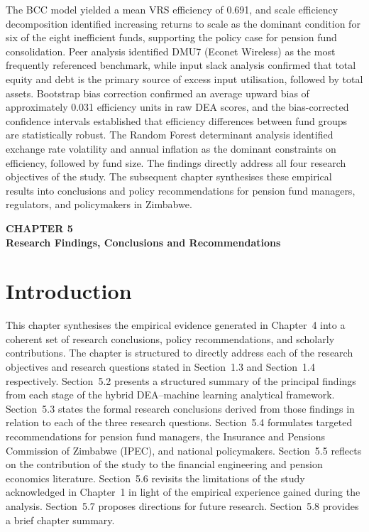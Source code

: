 \documentclass[12pt,a4paper]{article}
\begin{document}
The BCC model yielded a mean VRS efficiency of 0.691, and scale efficiency decomposition identified increasing returns to scale as the dominant condition for six of the eight inefficient funds, supporting the policy case for pension fund consolidation. Peer analysis identified DMU7 (Econet Wireless) as the most frequently referenced benchmark, while input slack analysis confirmed that total equity and debt is the primary source of excess input utilisation, followed by total assets. Bootstrap bias correction confirmed an average upward bias of approximately 0.031 efficiency units in raw DEA scores, and the bias-corrected confidence intervals established that efficiency differences between fund groups are statistically robust. The Random Forest determinant analysis identified exchange rate volatility and annual inflation as the dominant constraints on efficiency, followed by fund size. The findings directly address all four research objectives of the study. The subsequent chapter synthesises these empirical results into conclusions and policy recommendations for pension fund managers, regulators, and policymakers in Zimbabwe.
\newpage
\begin{center}
    {\LARGE\bfseries CHAPTER 5}\\[0.5cm]
    {\Large\bfseries Research Findings, Conclusions and Recommendations}
\end{center}
\setcounter{section}{0}
\renewcommand{\thesection}{5.\arabic{section}}
{}

\vspace{1cm}

\section{Introduction}

This chapter synthesises the empirical evidence generated in Chapter~4 into a coherent set of research conclusions, policy recommendations, and scholarly contributions. The chapter is structured to directly address each of the research objectives and research questions stated in Section~1.3 and Section~1.4 respectively. Section~5.2 presents a structured summary of the principal findings from each stage of the hybrid DEA--machine learning analytical framework. Section~5.3 states the formal research conclusions derived from those findings in relation to each of the three research questions. Section~5.4 formulates targeted recommendations for pension fund managers, the Insurance and Pensions Commission of Zimbabwe (IPEC), and national policymakers. Section~5.5 reflects on the contribution of the study to the financial engineering and pension economics literature. Section~5.6 revisits the limitations of the study acknowledged in Chapter~1 in light of the empirical experience gained during the analysis. Section~5.7 proposes directions for future research. Section~5.8 provides a brief chapter summary.
\end{document}
